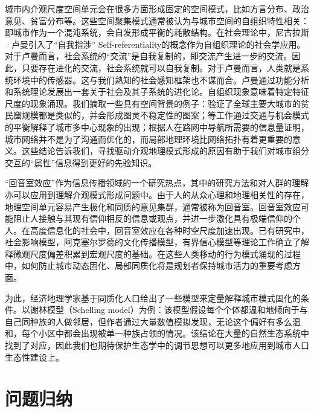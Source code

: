 城市内介观尺度空间单元会在很多方面形成固定的空间模式，比如方言分布\cite{burridge2017spatial}、政治意见\cite{rogers2013consensus}、贫富分布\cite{kirkley2020information}等。这些空间聚集模式通常被认为与城市空间的自组织特性相关：即城市作为一个混沌系统，会自发形成平衡的耗散结构。在社会理论中，尼古拉斯·卢曼引入了“自我指涉” Self-referentiality的概念作为自组织理论的社会学应用\cite{luhmann1984soziale}。对于卢曼而言，社会系统的“交流”是自我复制的，即交流产生进一步的交流。因此，只要存在进化的交流，社会系统就可以自我复制。对于卢曼而言，人类就是系统环境中的传感器。这与我们熟知的社会感知框架也不谋而合。卢曼通过功能分析和系统理论发展出一套关于社会及其子系统的进化论。自组织现象意味着特定特征尺度的现象涌现。我们摘取一些具有空间背景的例子：\cite{friesen2018similar, pelz2019similar}验证了全球主要大城市的贫民窟规模都是类似的，并会形成图灵不稳定性的图案；\cite{louf2013modeling, courtat2011mathematics}等工作通过交通与机会模式的平衡解释了城市多中心现象的出现；\cite{rosvall2005networks}根据人在路网中导航所需要的信息量证明，城市网络并不是为了沟通而优化的，而局部地理环境比网络拓扑有着更重要的意义。这些结论告诉我们，寻找驱动介观地理模式形成的原因有助于我们对城市组分交互的“属性”信息得到更好的先验知识。

“回音室效应”\cite{wang2020public, liu2020modeling}作为信息传播领域的一个研究热点，其中的研究方法和对人群的理解亦可以应用到理解介观模式形成问题中。由于人的从众心理和地理相关性的存在，地理空间单元容易产生极化和同质的意见集群，通常被称为回音室。回音室效应可能阻止人接触与其现有信仰相反的信息或观点，并进一步激化具有极端信仰的个人。在高度信息化的社会中，回音室效应在各种时空尺度加速出现\cite{wang2020public}。已有研究中，社会影响模型\cite{noah2006structural, friedkin2011social, parsegov2016novel}，阿克塞尔罗德的文化传播模型\cite{axelrod1997dissemination}，有界信心模型\cite{deffuant2000mixing}等理论工作确立了解释微观尺度偏差积累到宏观尺度的基础。在这些人类移动的行为模式涌现的过程中，如何防止城市动态固化、局部同质化将是规划者保持城市活力的重要考虑方面。

为此，经济地理学家基于同质化人口给出了一些模型来定量解释城市模式固化的条件。以谢林模型（Schelling model）为例\cite{schelling1971dynamic}：该模型假设每个个体都温和地倾向于与自己同种族的人做邻居，但作者通过大量数值模拟发现，无论这个偏好有多么温和，每个小区中都会出现被单一种族占领的情况。该结论在大量的自然生态系统中找到了对应\cite{traulsen2006stochastic,baxter2008fixation,lombardo2015fixation}，因此我们也期待保护生态学中的调节思想可以更多地应用到城市人口生态性建设上。

\section{问题归纳}



